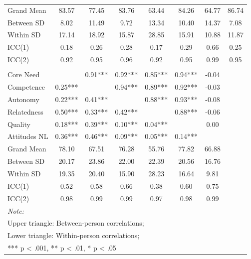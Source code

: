 \begin{table}
\begin{minipage}[t][\textheight][t]{\textwidth}
{\begin{tabular}[t]{lccccccc}
\addlinespace
\hspace{1em}Grand Mean & 83.57 & 77.45 & 83.76 & 63.44 & 84.26 & 64.77 & 86.74\\
\hspace{1em}Between SD & 8.02 & 11.49 & 9.72 & 13.34 & 10.40 & 14.37 & 7.08\\
\hspace{1em}Within SD & 17.14 & 18.92 & 15.87 & 28.85 & 15.91 & 10.88 & 11.87\\
\hspace{1em}ICC(1) & 0.18 & 0.26 & 0.28 & 0.17 & 0.29 & 0.66 & 0.25\\
\hspace{1em}ICC(2) & 0.92 & 0.95 & 0.96 & 0.92 & 0.95 & 0.99 & 0.95\\
\addlinespace[0.3em]
\multicolumn{8}{l}{\textbf{Across Studies}}\\
\hspace{1em}Core Need &  & 0.91*** & 0.92*** & 0.85*** & 0.94*** & -0.04 & \\
\hspace{1em}Competence & 0.25*** &  & 0.94*** & 0.89*** & 0.92*** & -0.03 & \\
\hspace{1em}Autonomy & 0.22*** & 0.41*** &  & 0.88*** & 0.93*** & -0.08 & \\
\hspace{1em}Relatedness & 0.50*** & 0.33*** & 0.42*** &  & 0.88*** & -0.06 & \\
\hspace{1em}Quality & 0.18*** & 0.39*** & 0.10*** & 0.04*** &  & 0.00 & \\
\hspace{1em}Attitudes NL & 0.36*** & 0.46*** & 0.09*** & 0.05*** & 0.14*** &  & \\
\addlinespace
\hspace{1em}Grand Mean & 78.10 & 67.51 & 76.28 & 55.76 & 77.82 & 66.88 & \\
\hspace{1em}Between SD & 20.17 & 23.86 & 22.00 & 22.39 & 20.56 & 16.76 & \\
\hspace{1em}Within SD & 19.35 & 20.40 & 15.90 & 28.23 & 16.64 & 9.81 & \\
\hspace{1em}ICC(1) & 0.52 & 0.58 & 0.66 & 0.38 & 0.60 & 0.75 & \\
\hspace{1em}ICC(2) & 0.98 & 0.99 & 0.99 & 0.97 & 0.98 & 0.99 & \\
\bottomrule
\multicolumn{8}{l}{\rule{0pt}{1em}\textit{Note: }}\\
\multicolumn{8}{l}{\rule{0pt}{1em}Upper triangle: Between-person correlations;}\\
\multicolumn{8}{l}{\rule{0pt}{1em}Lower triangle: Within-person correlations;}\\
\multicolumn{8}{l}{\rule{0pt}{1em}*** p < .001, ** p < .01,  * p < .05}\\
\end{tabular}}
\end{minipage}
\end{table}
